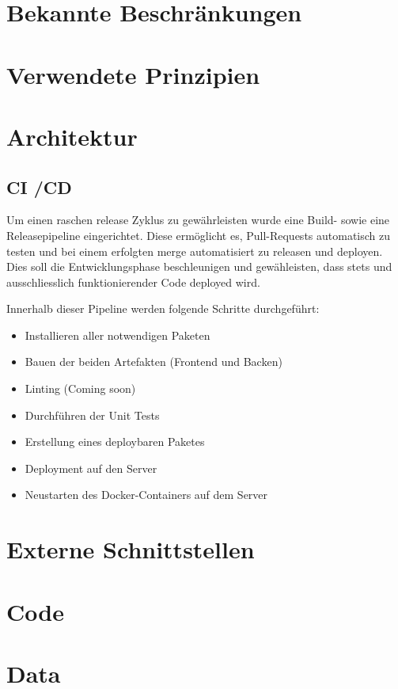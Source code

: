 \documentclass[a4paper, 11pt]{scrartcl}
\let\oldsection\section
\renewcommand\section{\clearpage\oldsection}
\begin{document}
\section{Bekannte Beschränkungen}

\section{Verwendete Prinzipien}

\section{Architektur}
\subsection{CI /CD}
Um einen raschen release Zyklus zu gewährleisten wurde eine Build- sowie eine Releasepipeline eingerichtet.
Diese ermöglicht es, Pull-Requests automatisch zu testen und bei einem erfolgten merge automatisiert zu releasen und deployen.
Dies soll die Entwicklungsphase beschleunigen und gewähleisten, dass stets und ausschliesslich funktionierender Code deployed wird.

Innerhalb dieser Pipeline werden folgende Schritte durchgeführt:
\begin{itemize}
  \item Installieren aller notwendigen Paketen
  \item Bauen der beiden Artefakten (Frontend und Backen)
  \item Linting (Coming soon)
  \item Durchführen der Unit Tests
  \item Erstellung eines deploybaren Paketes
  \item Deployment auf den Server
  \item Neustarten des Docker-Containers auf dem Server
\end{itemize}

\section{Externe Schnittstellen}

\section{Code}

\section{Data}
\end{document}
